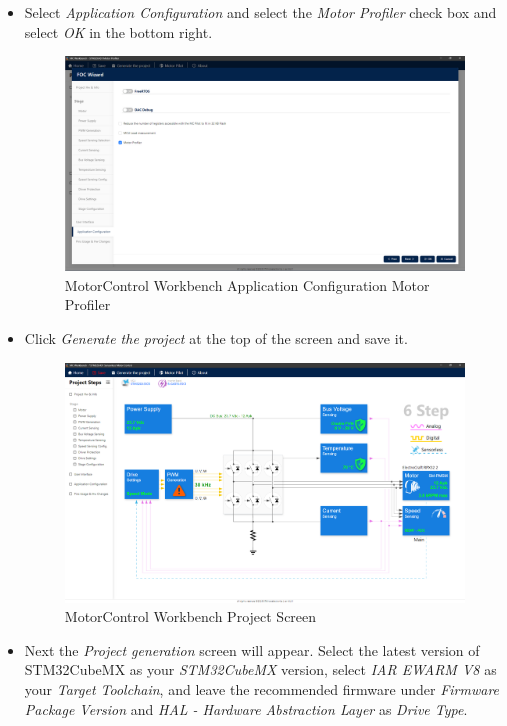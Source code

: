 \documentclass[10pt]{article}
\begin{document}
\begin{itemize}
\begin{figure}[H]
                    \end{figure}
                \item Select \emph{Application Configuration} and select the \emph{Motor Profiler} check box and select \emph{OK} in the bottom right.
                    \begin{figure}[H]
                        \centerline{\includegraphics[width=\textwidth]{References/MCW Application Configuration Motor Profiler.png}}
                        \caption{MotorControl Workbench Application Configuration Motor Profiler}
                    \end{figure}
                \item Click \emph{Generate the project} at the top of the screen and save it.
                    \begin{figure}[H]
                        \centerline{\includegraphics[width=\textwidth]{References/MCW Project Screen.png}}
                        \caption{MotorControl Workbench Project Screen}
                    \end{figure}
                \item Next the \emph{Project generation} screen will appear. Select the latest version of STM32CubeMX as your \emph{STM32CubeMX} version, select \emph{IAR EWARM V8} as your \emph{Target Toolchain}, and leave the recommended firmware under \emph{Firmware Package Version} and \emph{HAL - Hardware Abstraction Layer} as \emph{Drive Type}.

\end{itemize}
\end{document}

